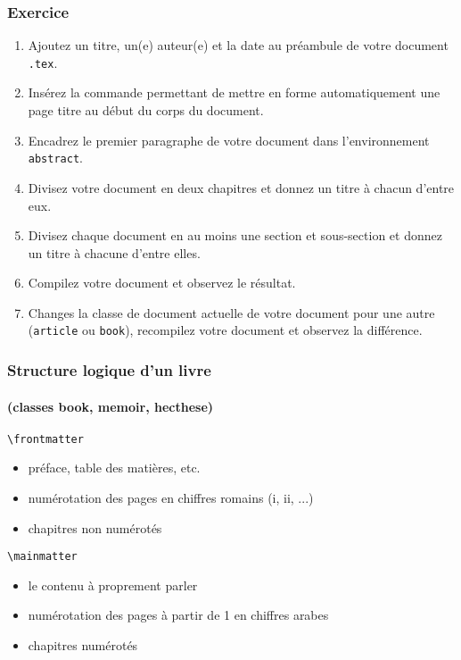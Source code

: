 
\begin{frame}

	\frametitle{Exercice \thenoExercice}
	
	\begin{enumerate}
		\item Ajoutez un titre, un(e) auteur(e) et la date au préambule de votre document \texttt{.tex}.
		\item Insérez la commande permettant de mettre en forme automatiquement une page titre
			au début du corps du document.
		\item Encadrez le premier paragraphe de votre document dans l'environnement \texttt{abstract}.
		\item Divisez votre document en deux chapitres et donnez un titre à chacun d'entre eux.
		\item Divisez chaque document en au moins une section et sous-section et donnez un titre à chacune d'entre elles.
		\item Compilez votre document et observez le résultat.
		\item Changes la classe de document actuelle de votre document pour une autre (\texttt{article} ou \texttt{book}), recompilez votre document et observez la différence.
	\end{enumerate}
\end{frame}


\begin{frame}[fragile]

	\frametitle{Structure logique d'un livre}
	\framesubtitle{(classes book, memoir, hecthese)}
	
	\lstinline|\frontmatter|	
	
	\begin{itemize}
		\item préface, table des matières, etc.
		\item numérotation des pages en chiffres romains (i, ii, ...)
		\item chapitres non numérotés
	\end{itemize}
	
	\lstinline|\mainmatter|	
	
	\begin{itemize}
		\item le contenu à proprement parler
		\item numérotation des pages à partir de 1 en chiffres arabes
		\item chapitres numérotés
	\end{itemize}

\end{frame}

